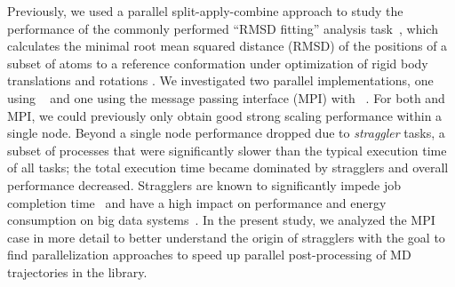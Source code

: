 Previously, we used a parallel split-apply-combine  approach to study the performance of the commonly performed ``RMSD fitting'' analysis task~\cite{Khoshlessan:2017ab, ICCP-2018}, which calculates the minimal root mean squared distance (RMSD) of the positions of a subset of atoms to a reference conformation under optimization of rigid body translations and rotations \cite{Liu:2010kx, Lea96, Mura:2014kx}.
We investigated two parallel implementations, one using ~\cite{Rocklin:2015aa} and one using the message passing interface (MPI) with ~\cite{Dalcin:2011aa, Dalcin:2005aa}. 
For both  and MPI, we could previously only obtain good strong scaling performance within a single node.
Beyond a single node performance dropped due to \emph{straggler} tasks, a subset of processes that were significantly slower than the typical execution time of all tasks; the total execution time became dominated by stragglers and overall performance decreased.
Stragglers are known to significantly impede job completion time~\cite{Garraghan2016} and have a high impact on performance and energy consumption on big data systems~\cite{Tien-2017}.
In the present study, we analyzed the MPI case in more detail to better understand the origin of stragglers with the goal to find  parallelization approaches to speed up parallel post-processing of MD trajectories in the  library.

